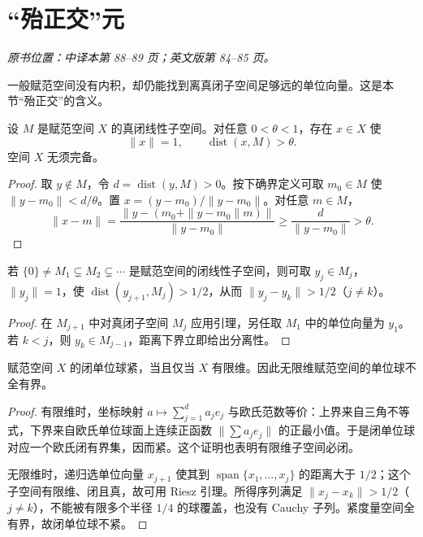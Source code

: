 \section{“殆正交”元}\label{sec:yosida-03-02}
\noindent\textit{原书位置：中译本第 88--89 页；英文版第 84--85 页。}

一般赋范空间没有内积，却仍能找到离真闭子空间足够远的单位向量。这是本节“殆正交”的含义。

\begin{lemma}[Riesz 引理]\label{lem:y3-riesz}
设 $M$ 是赋范空间 $X$ 的真闭线性子空间。对任意 $0<\theta<1$，存在 $x\in X$ 使
\[
 \|x\|=1,\qquad \operatorname{dist}(x,M)>\theta.
\]
空间 $X$ 无须完备。
\end{lemma}
\begin{proof}
取 $y\notin M$，令 $d=\operatorname{dist}(y,M)>0$。按下确界定义可取 $m_0\in M$ 使 $\|y-m_0\|<d/\theta$。置 $x=(y-m_0)/\|y-m_0\|$。对任意 $m\in M$，
\[
 \|x-m\|=\frac{\|y-(m_0+\|y-m_0\|m)\|}{\|y-m_0\|}
 \ge\frac d{\|y-m_0\|}>\theta.
\]
\end{proof}

\begin{corollary}[严格递增子空间中的分离向量]
若 $\{0\}\ne M_1\subsetneq M_2\subsetneq\cdots$ 是赋范空间的闭线性子空间，则可取 $y_j\in M_j$，$\|y_j\|=1$，使 $\operatorname{dist}(y_{j+1},M_j)>1/2$，从而 $\|y_j-y_k\|>1/2$（$j\ne k$）。
\end{corollary}
\begin{proof}
在 $M_{j+1}$ 中对真闭子空间 $M_j$ 应用引理，另任取 $M_1$ 中的单位向量为 $y_1$。若 $k<j$，则 $y_k\in M_{j-1}$，距离下界立即给出分离性。
\end{proof}

\begin{theorem}[局部紧性与维数]\label{thm:y3-compact-ball}
赋范空间 $X$ 的闭单位球紧，当且仅当 $X$ 有限维。因此无限维赋范空间的单位球不全有界。
\end{theorem}
\begin{proof}
有限维时，坐标映射 $a\mapsto\sum_{j=1}^da_je_j$ 与欧氏范数等价：上界来自三角不等式，下界来自欧氏单位球面上连续正函数 $\|\sum a_je_j\|$ 的正最小值。于是闭单位球对应一个欧氏闭有界集，因而紧。这个证明也表明有限维子空间必闭。

无限维时，递归选单位向量 $x_{j+1}$ 使其到 $\operatorname{span}\{x_1,\ldots,x_j\}$ 的距离大于 $1/2$；这个子空间有限维、闭且真，故可用 Riesz 引理。所得序列满足 $\|x_j-x_k\|>1/2$（$j\ne k$），不能被有限多个半径 $1/4$ 的球覆盖，也没有 Cauchy 子列。紧度量空间全有界，故闭单位球不紧。
\end{proof}

